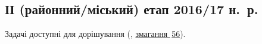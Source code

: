 \renewenvironment{problemAllDefault}[1]{\vspace{10mm}\par\begin{problem}{#1}{\stdinOrInputTxt}{\stdoutOrOutputTxt}{1 сек}{128 мегабайтів}}{\end{problem}}

\subsection{ІІ (районний/міський) етап 2016/17 н.~р.}

Задачі доступні для дорішування (\EjudgeCkipoName, \href{https://ejudge.ckipo.edu.ua/cgi-bin/new-register?contest_id=56}{змагання \textnumero$\,$56}).



	

	

	

	


